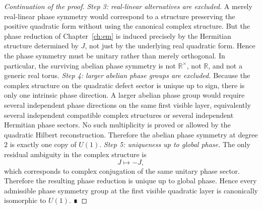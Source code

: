 \begin{proof}[Continuation of the proof]
	\smallskip
	\noindent\emph{Step 3: real-linear alternatives are excluded.}
	A merely real-linear phase symmetry would correspond to a structure
	preserving the positive quadratic form without using the canonical
	complex structure.
	But the phase reduction of Chapter~\ref{ch:em} is induced precisely by
	the Hermitian structure determined by \(J\), not just by the underlying real
	quadratic form.
	Hence the phase symmetry must be unitary rather than merely orthogonal.
	In particular, the surviving abelian phase symmetry is not
	\(\mathbb R^\times\), not \(\mathbb R\), and not a generic real torus.
	\smallskip
	\noindent\emph{Step 4: larger abelian phase groups are excluded.}
	Because the complex structure on the quadratic defect sector is unique up
	to sign, there is only one intrinsic phase direction.
	A larger abelian phase group would require several independent phase
	directions on the same first visible layer, equivalently several
	independent compatible complex structures or several independent
	Hermitian phase sectors.
	No such multiplicity is proved or allowed by the quadratic Hilbert
	reconstruction.
	Therefore the abelian phase symmetry at degree $2$ is exactly one copy of
	\(U(1)\).
	\smallskip
	\noindent\emph{Step 5: uniqueness up to global phase.}
	The only residual ambiguity in the complex structure is
	\[
		J\mapsto -J,
	\]
	which corresponds to complex conjugation of the same unitary phase
	sector.
	Therefore the resulting phase reduction is unique up to global phase.
	Hence every admissible phase symmetry group at the first visible
	quadratic layer is canonically isomorphic to \(U(1)\). ∎
\end{proof}
